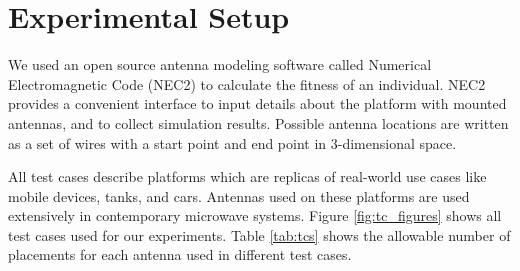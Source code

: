 \documentclass[conference]{IEEEtran}
\begin{document}
\section{Experimental Setup}
\label{sec:setup}
We used an open source antenna modeling software called Numerical Electromagnetic Code (NEC2) to calculate the fitness of an individual. NEC2 provides a convenient interface to input details about the platform with mounted antennas, and to collect simulation results. Possible antenna locations are written as a set of wires with a start point and end point in 3-dimensional space.

All test cases describe platforms which are replicas of real-world use cases like mobile devices, tanks, and cars. Antennas used on these platforms are used extensively in contemporary microwave systems. Figure \ref{fig:tc_figures} shows all test cases used for our experiments. Table \ref{tab:tcs} shows the allowable number of placements for each antenna used in different test cases. 
\end{document}
